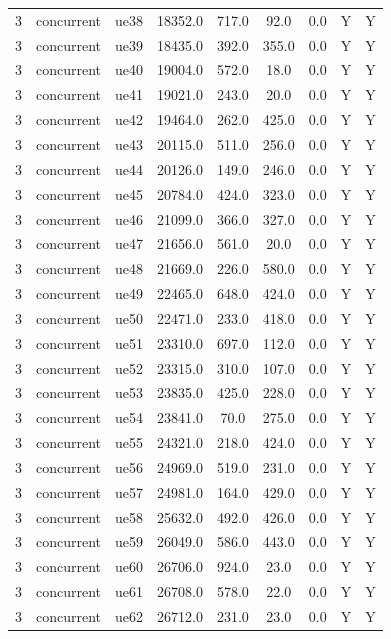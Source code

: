 \begin{table}[ht]
\begin{tabular}{|c|c|c|c|c|c|c|c|c|}
3 & concurrent & ue38 & 18352.0 & 717.0 & 92.0 & 0.0 & Y & Y \\
3 & concurrent & ue39 & 18435.0 & 392.0 & 355.0 & 0.0 & Y & Y \\
3 & concurrent & ue40 & 19004.0 & 572.0 & 18.0 & 0.0 & Y & Y \\
3 & concurrent & ue41 & 19021.0 & 243.0 & 20.0 & 0.0 & Y & Y \\
3 & concurrent & ue42 & 19464.0 & 262.0 & 425.0 & 0.0 & Y & Y \\
3 & concurrent & ue43 & 20115.0 & 511.0 & 256.0 & 0.0 & Y & Y \\
3 & concurrent & ue44 & 20126.0 & 149.0 & 246.0 & 0.0 & Y & Y \\
3 & concurrent & ue45 & 20784.0 & 424.0 & 323.0 & 0.0 & Y & Y \\
3 & concurrent & ue46 & 21099.0 & 366.0 & 327.0 & 0.0 & Y & Y \\
3 & concurrent & ue47 & 21656.0 & 561.0 & 20.0 & 0.0 & Y & Y \\
3 & concurrent & ue48 & 21669.0 & 226.0 & 580.0 & 0.0 & Y & Y \\
3 & concurrent & ue49 & 22465.0 & 648.0 & 424.0 & 0.0 & Y & Y \\
3 & concurrent & ue50 & 22471.0 & 233.0 & 418.0 & 0.0 & Y & Y \\
3 & concurrent & ue51 & 23310.0 & 697.0 & 112.0 & 0.0 & Y & Y \\
3 & concurrent & ue52 & 23315.0 & 310.0 & 107.0 & 0.0 & Y & Y \\
3 & concurrent & ue53 & 23835.0 & 425.0 & 228.0 & 0.0 & Y & Y \\
3 & concurrent & ue54 & 23841.0 & 70.0 & 275.0 & 0.0 & Y & Y \\
3 & concurrent & ue55 & 24321.0 & 218.0 & 424.0 & 0.0 & Y & Y \\
3 & concurrent & ue56 & 24969.0 & 519.0 & 231.0 & 0.0 & Y & Y \\
3 & concurrent & ue57 & 24981.0 & 164.0 & 429.0 & 0.0 & Y & Y \\
3 & concurrent & ue58 & 25632.0 & 492.0 & 426.0 & 0.0 & Y & Y \\
3 & concurrent & ue59 & 26049.0 & 586.0 & 443.0 & 0.0 & Y & Y \\
3 & concurrent & ue60 & 26706.0 & 924.0 & 23.0 & 0.0 & Y & Y \\
3 & concurrent & ue61 & 26708.0 & 578.0 & 22.0 & 0.0 & Y & Y \\
3 & concurrent & ue62 & 26712.0 & 231.0 & 23.0 & 0.0 & Y & Y \\

\end{tabular}
\end{table}
